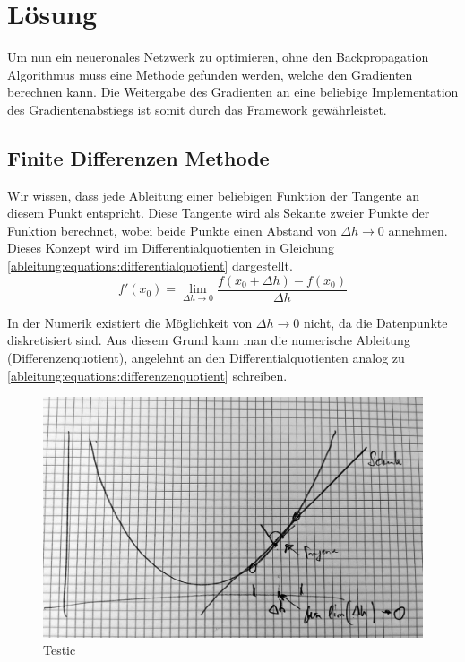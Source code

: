 %
%
%
\section{Lösung
\label{ableitung:section:loesung}}
Um nun ein neueronales Netzwerk zu optimieren, ohne den Backpropagation Algorithmus muss eine Methode gefunden werden, welche den Gradienten berechnen kann. Die Weitergabe des Gradienten an eine beliebige Implementation des Gradientenabstiegs ist somit durch das Framework gewährleistet.
\subsection{Finite Differenzen Methode}
Wir wissen, dass jede Ableitung einer beliebigen Funktion der Tangente an diesem Punkt entspricht. Diese Tangente wird als Sekante zweier Punkte der Funktion berechnet, wobei beide Punkte einen Abstand von $\Delta h \rightarrow 0$ annehmen. Dieses Konzept wird im Differentialquotienten in Gleichung \ref{ableitung:equations:differentialquotient} dargestellt.
\begin{equation}
f'(x_0) = \lim_{{\Delta h} \rightarrow 0} \frac{f(x_0+\Delta h) - f(x_0)}{\Delta h}
\label{ableitung:equations:differentialquotient}
\end{equation}

In der Numerik existiert die Möglichkeit von $\Delta h \rightarrow 0$ nicht, da die Datenpunkte diskretisiert sind. Aus diesem Grund kann man die numerische Ableitung (Differenzenquotient), angelehnt an den Differentialquotienten analog zu \ref{ableitung:equations:differenzenquotient} schreiben.

\begin{figure}
	\begin{center}
		\includegraphics[width=12cm]{papers/ableitung/images/sekante_bsp.jpg}
		\caption{Testic}
		\label{ableitung:fig:ableitung_bsp}
	\end{center}
\end{figure}

